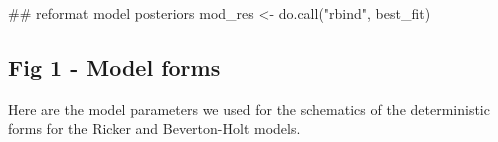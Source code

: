 \documentclass[
  11pt,
]{article}
\newenvironment{Shaded}{}{}
\newcommand{\DocumentationTok}[1]{\textcolor[rgb]{0.00,0.50,0.00}{#1}}
\newcommand{\FunctionTok}[1]{#1}
\newcommand{\NormalTok}[1]{#1}
\newcommand{\OtherTok}[1]{\textcolor[rgb]{1.00,0.25,0.00}{#1}}
\newcommand{\StringTok}[1]{\textcolor[rgb]{0.00,0.50,0.50}{#1}}
\begin{document}
\begin{Shaded}
\begin{Highlighting}[]
\DocumentationTok{\#\# reformat model posteriors}
\NormalTok{mod\_res }\OtherTok{\textless{}{-}} \FunctionTok{do.call}\NormalTok{(}\StringTok{"rbind"}\NormalTok{, best\_fit)}
\end{Highlighting}
\end{Shaded}

\hypertarget{fig-1---model-forms}{%
\subsection{Fig 1 - Model forms}\label{fig-1---model-forms}}

Here are the model parameters we used for the schematics of the
deterministic forms for the Ricker and Beverton-Holt models.
\end{document}
